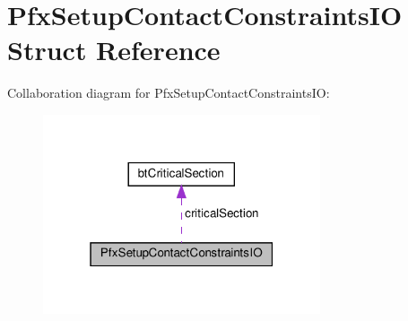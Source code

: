 \hypertarget{structPfxSetupContactConstraintsIO}{}\section{Pfx\+Setup\+Contact\+Constraints\+IO Struct Reference}
\label{structPfxSetupContactConstraintsIO}


Collaboration diagram for Pfx\+Setup\+Contact\+Constraints\+IO\+:
\nopagebreak
\begin{figure}[H]
\begin{center}
\leavevmode
\includegraphics[width=232pt]{structPfxSetupContactConstraintsIO__coll__graph}
\end{center}
\end{figure}
